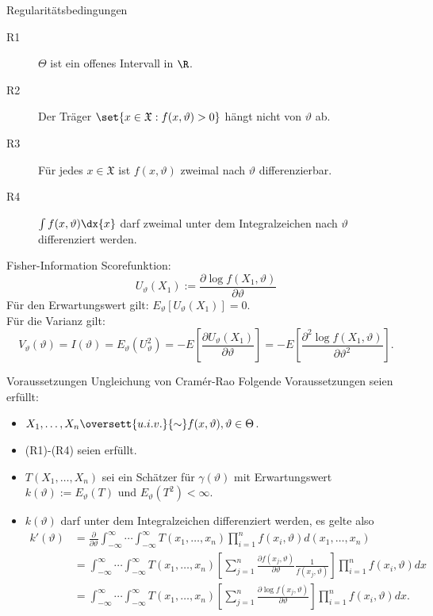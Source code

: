 \begin{karte}{Regularitätsbedingungen}
    \begin{description}
        \item[R1] \(\Theta\) ist ein offenes Intervall in \(\R\).
        \item[R2] Der Träger \(\set{x\in \mathfrak{X}: f(x, \vartheta)>0}\) hängt nicht von \(\vartheta\) ab.
        \item[R3] Für jedes \(x \in \mathfrak{X}\) ist \(f(x, \vartheta)\) zweimal nach \(\vartheta\) differenzierbar.
        \item[R4] \(\int f(x, \vartheta) \dx{x}\) darf zweimal unter dem Integralzeichen nach \(\vartheta\) differenziert werden.
    \end{description}
\end{karte}

\begin{karte}{Fisher-Information}
    Scorefunktion: 
    \[ U_\vartheta(X_1) := \frac{\partial \log f(X_1, \vartheta)}{\partial \vartheta} \]
    Für den Erwartungswert gilt: \(E_\vartheta[U_\vartheta(X_1)] = 0 \).\\
    Für die Varianz gilt: 
    \[ V_\vartheta(\vartheta) = I(\vartheta) = E_\vartheta(U_\vartheta^2) = -E\left[ \frac{\partial U_\vartheta(X_1)}{\partial \vartheta} \right] = -E\left[\frac{\partial^2 \log f(X_1, \vartheta)}{\partial \vartheta^2}\right]. \]
\end{karte}

\begin{karte}{Voraussetzungen Ungleichung von Cramér-Rao}
    Folgende Voraussetzungen seien erfüllt: 
    \begin{itemize}
        \item \(X_1, \ldots, X_n \oversett{u.i.v.}{\sim} f(x, \vartheta), \vartheta \in \Theta\).
        \item (R1)-(R4) seien erfüllt.
        \item \(T(X_1, \ldots, X_n)\) sei ein Schätzer für \(\gamma(\vartheta)\) mit Erwartungswert \(k(\vartheta) := E_\vartheta(T) \) und \(E_\vartheta(T^2) < \infty\).
        \item \(k(\vartheta)\) darf unter dem Integralzeichen differenziert werden, es gelte also 
        \begin{align*}
            k'(\vartheta) &= \frac{\partial}{\partial \vartheta} \int_{-\infty}^\infty \cdots \int_{-\infty}^\infty T(x_1, \ldots, x_n) \prod_{i=1}^n f(x_i, \vartheta) d(x_1, \ldots, x_n) \\
            &= \int_{-\infty}^\infty \cdots \int_{-\infty}^\infty T(x_1, \ldots, x_n) \left[ \sum_{j=1}^n \frac{\partial f(x_j, \vartheta)}{\partial \vartheta} \frac{1}{f(x_j, \vartheta)} \right] \prod_{i=1}^n f(x_i, \vartheta) dx \\
            &= \int_{-\infty}^\infty \cdots \int_{-\infty}^\infty T(x_1, \ldots, x_n) \left[ \sum_{j=1}^n \frac{\partial \log f(x_j, \vartheta)}{\partial \vartheta} \right] \prod_{i=1}^n f(x_i, \vartheta) dx.
        \end{align*}
    \end{itemize}
\end{karte}

